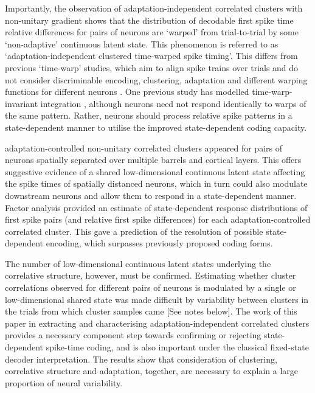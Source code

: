 \documentclass{article}
\begin{document}
Importantly, the observation of adaptation-independent correlated clusters with non-unitary gradient shows that the distribution of decodable first spike time relative differences for pairs of neurons are `warped' from trial-to-trial by some `non-adaptive' continuous latent state. This phenomenon is referred to as `adaptation-independent clustered time-warped spike timing'. This differs from previous `time-warp' studies, which aim to align spike trains over trials and do not consider discriminable encoding, clustering, adaptation and different warping functions for different neurons \cite{williams2020discovering}. One previous study has modelled time-warp-invariant integration \cite{gutig2009time}, although neurons need not respond identically to warps of the same pattern. Rather, neurons should process relative spike patterns in a state-dependent manner to utilise the improved state-dependent coding capacity.

adaptation-controlled non-unitary correlated clusters appeared for pairs of neurons spatially separated over multiple barrels and cortical layers. This offers suggestive evidence of a shared low-dimensional continuous latent state affecting the spike times of spatially distanced neurons, which in turn could also modulate downstream neurons and allow them to respond in a state-dependent manner. Factor analysis provided an estimate of state-dependent response distributions of first spike pairs (and relative first spike differences) for each adaptation-controlled correlated cluster. This gave a prediction of the resolution of possible state-dependent encoding, which surpasses previously proposed coding forms. 

The number of low-dimensional continuous latent states underlying the correlative structure, however, must be confirmed. Estimating whether cluster correlations observed for different pairs of neurons is modulated by a single or low-dimensional shared state was made difficult by variability between clusters in the trials from which cluster samples came [See notes below]. The work of this paper in extracting and characterising adaptation-independent correlated clusters provides a necessary component step towards confirming or rejecting state-dependent spike-time coding, and is also important under the classical fixed-state decoder interpretation. The results show that consideration of clustering, correlative structure and adaptation, together, are necessary to explain a large proportion of neural variability.
\end{document}
